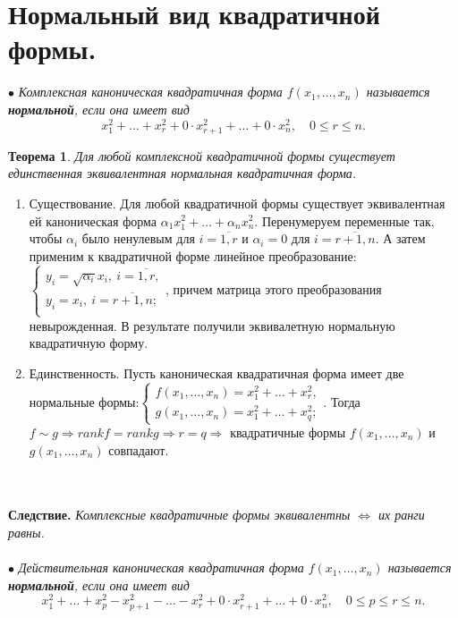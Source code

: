 \section{Нормальный вид квадратичной формы.}
$\bullet$ \textit{Комплексная каноническая квадратичная форма $f(x_1,\dots,x_n)$ называется \textbf{нормальной}, если она имеет вид}
$$x_1^2+ \ldots +x_r^2+0\cdot x_{r+1}^2+ \ldots +0\cdot x_n^2,\quad 0\leqslant r\leqslant n.$$
\newtheorem*{th13_4_1}{Теорема}\begin{th13_4_1}Для любой комплексной квадратичной формы существует единственная эквивалентная нормальная квадратичная форма.
\end{th13_4_1}\begin{Proof}\begin{enumerate}
		\item Существование. Для любой квадратичной формы существует эквивалентная ей каноническая форма $\alpha_1 x_1^2+ \ldots +\alpha_n x_n^2$. Перенумеруем переменные так, чтобы $\alpha_i$ было ненулевым для $i=\overline{1,r}$ и $\alpha_i=0$ для $i=\overline{r+1,n}$. А затем применим к квадратичной форме линейное преобразование: $\begin{cases}
			y_i=\sqrt{\alpha_i} x_i,\ i=\overline{1,r},\\
			y_i=x_i,\ i=\overline{r+1,n};\\
		\end{cases}$, причем матрица этого преобразования невырожденная. В результате получили эквивалетную нормальную квадратичную форму.
		\item Единственность. Пусть каноническая квадратичная форма имеет две нормальные формы:$\begin{cases}
			f(x_1,\dots,x_n)=x_1^2+ \ldots +x_r^2,\\
			g(x_1,\dots,x_n)=x_1^2+ \ldots +x_q^2;
		\end{cases}$. Тогда $f \sim g \Rightarrow rankf=rankg\Rightarrow r=q \Rightarrow$ квадратичные формы $f(x_1,\dots,x_n)$ и $g(x_1,\dots,x_n)$ совпадают.
	\end{enumerate}
\end{Proof}\\\\
\textbf{Следствие.} \textit{Комплексные квадратичные формы эквивалентны $\Longleftrightarrow$ их ранги равны.}\\\\
$\bullet$ \textit{Действительная каноническая квадратичная форма $f(x_1,\dots,x_n)$ называется \textbf{нормальной}, если она имеет вид}
$$x_1^2+ \ldots +x_p^2-x_{p+1}^2-\ldots-x_r^2+0 \cdot x_{r+1}^2+ \ldots +0 \cdot x_n^2,\quad 0\leqslant p\leqslant r\leqslant n.$$
